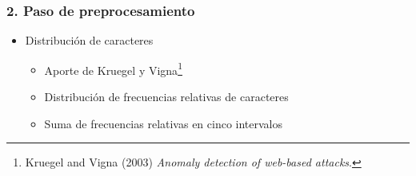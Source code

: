 \begin{frame}[t]
    \frametitle{2. Paso de preprocesamiento}

    \begin{itemize}
        \item
        Distribución de caracteres

        \begin{itemize}
            \item
            Aporte de Kruegel y Vigna\footnote{
                Kruegel and Vigna (2003) \textit{Anomaly detection of
                web-based attacks}.}

            \item
            Distribución de frecuencias relativas de caracteres

            \item
            Suma de frecuencias relativas en cinco intervalos
        \end{itemize}
    \end{itemize}


\end{frame}

